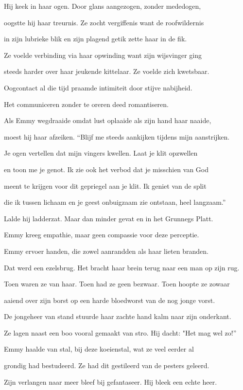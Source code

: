 Hij keek in haar ogen.
Door glans aangezogen,
zonder mededogen,

oogstte hij haar treurnis.
Ze zocht vergiffenis
want de roofwildernis

in zijn lubrieke blik
en zijn plagend getik
zette haar in de fik.

Ze voelde verbinding
via haar opwinding
want zijn wijsvinger ging

steeds harder over haar
jeukende kittelaar.
Ze voelde zich kwetsbaar.

Oogcontact al die tijd
praamde intimiteit
door stijve nabijheid.

Het communiceren
zonder te oreren
deed romantiseren.

Als Emmy wegdraaide
omdat lust oplaaide
als zijn hand haar naaide,

moest hij haar afzeiken.
“Blijf me steeds aankijken
tijdens mijn aanstrijken.

Je ogen vertellen
dat mijn vingers kwellen.
Laat je klit opzwellen

en toon me je genot.
Ik zie ook het verbod
dat je misschien van God

meent te krijgen voor dit
gepriegel aan je klit.
Ik geniet van de split

die ik tussen lichaam
en je geest onbuigzaam
zie ontstaan, heel langzaam.”

Lalde hij ladderzat.
Maar dan minder gevat
en in het Grunnegs Platt.

Emmy kreeg empathie,
maar geen compassie
voor deze perceptie.

Emmy ervoer handen,
die zowel aanrandden
als haar lieten branden.

Dat werd een ezelsbrug.
Het bracht haar brein terug
naar een man op zijn rug.

Toen waren ze van haar.
Toen had ze geen bezwaar.
Toen hoopte ze zowaar

aaiend over zijn borst
op een harde bloedworst
van de nog jonge vorst.

De jongeheer van stand
stuurde haar zachte hand
kalm naar zijn onderkant.

Ze lagen naast een boo
vooral gemaakt van stro.
Hij dacht: "Het mag wel zo!”

Emmy haalde van stal,
bij deze koeienstal,
wat ze veel eerder al

grondig had bestudeerd.
Ze had dit gestileerd
van de pesters geleerd.

Zijn verlangen naar meer
bleef bij gefantaseer.
Hij bleek een echte heer.


